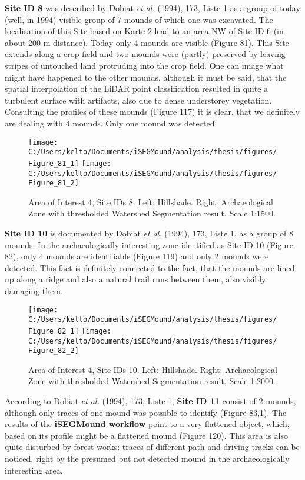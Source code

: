 \documentclass[
  12pt,
]{article}
\begin{document}
\textbf{Site ID 8} was described by Dobiat \emph{et al.} (1994), 173, Liste 1 as a group of today (well, in 1994) visible group of 7 mounds of which one was excavated. The localisation of this Site based on Karte 2 lead to an area NW of Site ID 6 (in about 200 m distance). Today only 4 mounds are visible (Figure 81). This Site extends along a crop field and two mounds were (partly) preserved by leaving stripes of untouched land protruding into the crop field. One can image what might have happened to the other mounds, although it must be said, that the spatial interpolation of the LiDAR point classification resulted in quite a turbulent surface with artifacts, also due to dense understorey vegetation. Consulting the profiles of these mounds (Figure 117) it is clear, that we definitely are dealing with 4 mounds. Only one mound was detected.

\begin{figure}
\texttt{[image: C:/Users/kelto/Documents/iSEGMound/analysis/thesis/figures/Figure\_81\_1]} \texttt{[image: C:/Users/kelto/Documents/iSEGMound/analysis/thesis/figures/Figure\_81\_2]} \caption{Area of Interest 4, Site IDs 8. Left: Hillshade. Right: Archaeological Zone with thresholded Watershed Segmentation result. Scale 1:1500.}\label{fig:Figure81}
\end{figure}

\textbf{Site ID 10} is documented by Dobiat \emph{et al.} (1994), 173, Liste 1, as a group of 8 mounds. In the archaeologically interesting zone identified as Site ID 10 (Figure 82), only 4 mounds are identifiable (Figure 119) and only 2 mounds were detected. This fact is definitely connected to the fact, that the mounds are lined up along a ridge and also a natural trail runs between them, also visibly damaging them.

\begin{figure}
\texttt{[image: C:/Users/kelto/Documents/iSEGMound/analysis/thesis/figures/Figure\_82\_1]} \texttt{[image: C:/Users/kelto/Documents/iSEGMound/analysis/thesis/figures/Figure\_82\_2]} \caption{Area of Interest 4, Site IDs 10. Left: Hillshade. Right: Archaeological Zone with thresholded Watershed Segmentation result. Scale 1:2000.}\label{fig:Figure82}
\end{figure}

According to Dobiat \emph{et al.} (1994), 173, Liste 1, \textbf{Site ID 11} consist of 2 mounds, although only traces of one mound was possible to identify (Figure 83,1). The results of the \textbf{iSEGMound workflow} point to a very flattened object, which, based on its profile might be a flattened mound (Figure 120). This area is also quite disturbed by forest works: traces of different path and driving tracks can be noticed, right by the presumed but not detected mound in the archaeologically interesting area.
\end{document}
